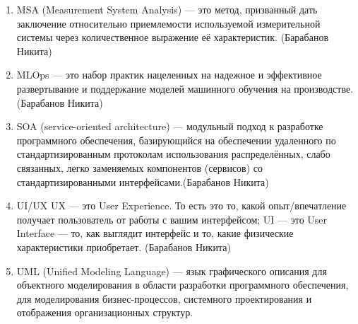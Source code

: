 \documentclass{article}
\begin{document}
\begin{enumerate}
    \item MSA (Measurement System Analysis) --- это метод, призванный дать заключение относительно приемлемости используемой измерительной системы через количественное выражение её характеристик. (Барабанов Никита)
    \item MLOps --- это набор практик нацеленных на надежное и эффективное развертывание и поддержание моделей машинного обучения на производстве.(Барабанов Никита)
    \item SOA (service-oriented architecture) --- модульный подход к разработке программного обеспечения, базирующийся на обеспечении удаленного по стандартизированным протоколам использования распределённых, слабо связанных, легко заменяемых компонентов (сервисов) со стандартизированными интерфейсами.(Барабанов Никита)
    \item UI/UX UX --- это User Experience. То есть это то, какой опыт/впечатление получает пользователь от работы с вашим интерфейсом; UI --- это User Interface --- то, как выглядит интерфейс и то, какие физические характеристики приобретает. (Барабанов Никита)
    \item UML (Unified Modeling Language)  --- язык графического описания для объектного моделирования в области разработки программного обеспечения, для моделирования бизнес-процессов, системного проектирования и отображения организационных структур.
\end{enumerate}
\end{document}
